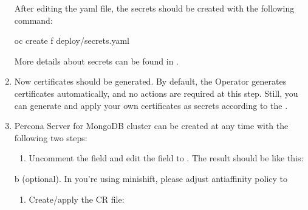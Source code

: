 \documentclass[letterpaper,10pt,english]{sphinxmanual}
\begin{document}
\begin{enumerate}
After editing the yaml file, the secrets should be created
with the following command:

\begin{sphinxVerbatim}[commandchars=\\\{\}]
\PYGZdl{} oc create \PYGZhy{}f deploy/secrets.yaml
\end{sphinxVerbatim}

More details about secrets can be found in {\hyperref[\detokenize{users:users}]{}}.

\item {} 
Now certificates should be generated. By default, the Operator generates
certificates automatically, and no actions are required at this step. Still,
you can generate and apply your own certificates as secrets according
to the {\hyperref[\detokenize{TLS:tls}]{}}.

\item {} 
Percona Server for MongoDB cluster can
be created at any time with the following two steps:
\begin{enumerate}
%
\item {} 
Uncomment the  field  and edit the field
to . The result should be like this:

\begin{sphinxVerbatim}[commandchars=\\\{\}]
 
 
   
   
\end{sphinxVerbatim}

\end{enumerate}

b (optional). In you’re using minishift, please adjust antiaffinity policy to 
\begin{quote}

\begin{sphinxVerbatim}[commandchars=\\\{\}]
      
\end{sphinxVerbatim}
\end{quote}
\begin{enumerate}
%
\setcounter{enumii}{2}
\item {} 
Create/apply the CR file:


\end{enumerate}
\end{enumerate}
\end{document}
